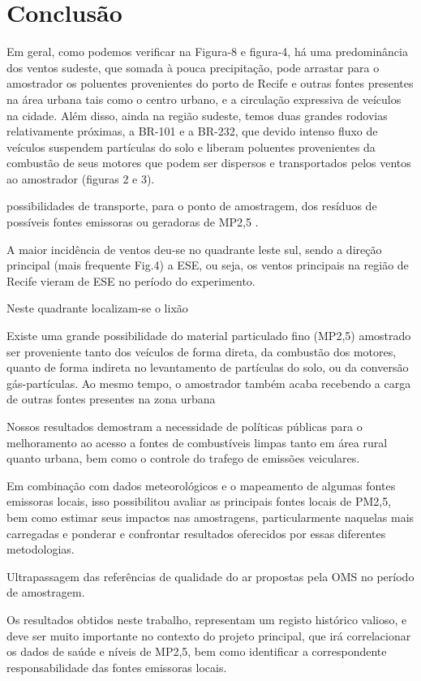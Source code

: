 \section{Conclusão}

Em geral, como podemos verificar na Figura-8 e figura-4, há uma  predominância dos ventos sudeste, que somada à pouca precipitação, pode arrastar para o amostrador os poluentes provenientes do porto de Recife e outras fontes presentes na área urbana tais como o centro urbano, e a  circulação expressiva de veículos na cidade. Além disso, ainda na região sudeste, temos duas grandes rodovias relativamente próximas, a BR-101 e a BR-232, que devido intenso fluxo de veículos suspendem partículas do solo e liberam poluentes provenientes da combustão de seus motores que podem ser dispersos e transportados pelos ventos ao amostrador (figuras 2 e 3).


possibilidades de transporte, para o ponto de amostragem, dos resíduos de possíveis fontes emissoras ou geradoras  de MP2,5 .

A maior incidência de ventos deu-se no quadrante leste sul, sendo a direção principal (mais frequente Fig.4) a ESE, ou seja, os ventos principais na região de Recife vieram de ESE no período do experimento.

Neste quadrante localizam-se o lixão

Existe uma grande possibilidade do material particulado fino (MP2,5) amostrado ser proveniente tanto dos veículos de forma direta, da combustão dos motores, quanto de forma indireta no levantamento de partículas do solo, ou da conversão gás-partículas. Ao mesmo tempo, o amostrador também acaba recebendo a carga de outras fontes presentes na zona urbana

Nossos resultados demostram a necessidade de políticas públicas para o 
melhoramento ao acesso a fontes de combustíveis limpas tanto em área rural 
quanto urbana, bem como o controle do trafego de emissões veiculares.

Em combinação com dados meteorológicos e o mapeamento de algumas fontes emissoras locais, isso possibilitou avaliar as principais fontes locais de PM2,5, bem como estimar seus impactos nas amostragens, particularmente naquelas mais carregadas e ponderar e confrontar resultados oferecidos por essas diferentes metodologias.

Ultrapassagem das referências de qualidade do ar propostas pela OMS no período de amostragem. 

Os resultados obtidos neste trabalho, representam um registo histórico valioso, 
e deve ser muito importante no contexto do projeto principal, que irá correlacionar os dados de saúde e níveis de MP2,5, bem como identificar a correspondente responsabilidade das fontes emissoras locais.

